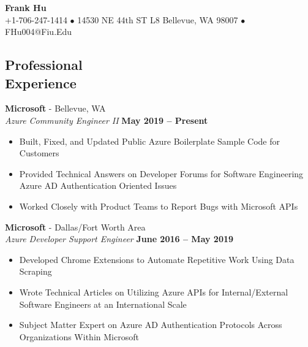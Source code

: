\documentclass[margin,line]{resume}
\begin{document}
	{\centering \LARGE{\textbf{Frank Hu}}}
	\\
	\normalsize
	+1-706-247-1414 $\bullet$ 14530 NE 44th ST L8 Bellevue, WA 98007 $\bullet$ FHu004@Fiu.Edu
	
	\begin{resume}
	
		
	\section{\mysidestyle Professional\\Experience}
	
	\textbf{Microsoft} - Bellevue, WA \vspace{1mm}\\\vspace{1mm}
	\textsl{Azure Community Engineer II} \hfill \textbf{May 2019 -- Present}
	\begin{itemize}
		\item Built, Fixed, and Updated Public Azure Boilerplate Sample Code for Customers
		\item Provided Technical Answers on Developer Forums for Software Engineering \\Azure AD Authentication Oriented Issues
		\item Worked Closely with Product Teams to Report Bugs with Microsoft APIs
	\end{itemize}
		
	\textbf{Microsoft} - Dallas/Fort Worth Area\vspace{1mm}\\\vspace{1mm}
	\textsl{Azure Developer Support Engineer} \hfill \textbf{June 2016 -- May 2019}
	\begin{itemize}
		 \item Developed Chrome Extensions to Automate Repetitive Work Using Data Scraping
		 \item Wrote Technical Articles on Utilizing Azure APIs for Internal/External Software Engineers at an International Scale
		 \item Subject Matter Expert on Azure AD Authentication Protocols Across Organizations Within Microsoft
	
	\end{itemize}


\end{resume}
\end{document}
